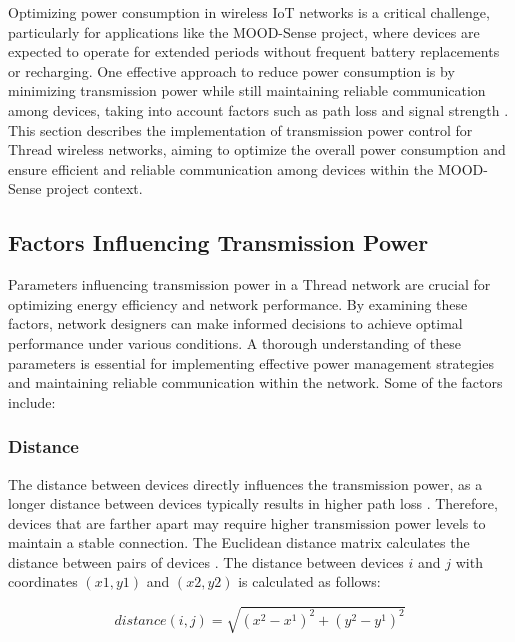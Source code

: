 Optimizing power consumption in wireless \gls{IoT} networks is a critical challenge, particularly for applications like the MOOD-Sense project, where devices are expected to operate for extended periods without frequent battery replacements or recharging. One effective approach to reduce power consumption is by minimizing transmission power while still maintaining reliable communication among devices, taking into account factors such as path loss and signal strength \cite{sheth2002implementation}. This section describes the implementation of transmission power control for Thread wireless networks, aiming to optimize the overall power consumption and ensure efficient and reliable communication among devices within the MOOD-Sense project context.

\subsection{Factors Influencing Transmission Power}

Parameters influencing transmission power in a Thread network are crucial for optimizing energy efficiency and network performance. By examining these factors, network designers can make informed decisions to achieve optimal performance under various conditions. A thorough understanding of these parameters is essential for implementing effective power management strategies and maintaining reliable communication within the network. Some of the factors include:

\subsubsection{Distance}

The distance between devices directly influences the transmission power, as a longer distance between devices typically results in higher path loss \cite{wu2014study}. Therefore, devices that are farther apart may require higher transmission power levels to maintain a stable connection. The Euclidean distance matrix calculates the distance between pairs of devices \cite{dokmanic2015euclidean}. The distance between devices $i$ and $j$ with coordinates $\left(x1,y1\right)$ and $\left(x2,y2\right)$ is calculated as follows:

\begin{equation}\label{eq:euclidean_distance}
    distance\left(i,j\right)=\sqrt{\left(x^2-x^1\right)^2+\left(y^2-y^1\right)^2}
\end{equation}

